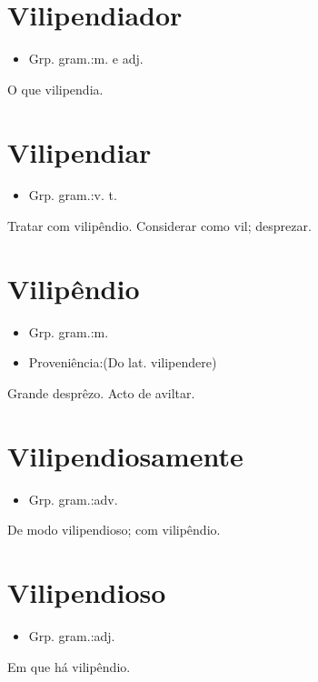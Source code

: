 \documentclass{article}
\begin{document}
\section{Vilipendiador}
\begin{itemize}
\item {Grp. gram.:m.  e  adj.}
\end{itemize}
O que vilipendia.
\section{Vilipendiar}
\begin{itemize}
\item {Grp. gram.:v. t.}
\end{itemize}
Tratar com vilipêndio.
Considerar como vil; desprezar.
\section{Vilipêndio}
\begin{itemize}
\item {Grp. gram.:m.}
\end{itemize}
\begin{itemize}
\item {Proveniência:(Do lat. \textunderscore vilipendere\textunderscore )}
\end{itemize}
Grande desprêzo.
Acto de aviltar.
\section{Vilipendiosamente}
\begin{itemize}
\item {Grp. gram.:adv.}
\end{itemize}
De modo vilipendioso; com vilipêndio.
\section{Vilipendioso}
\begin{itemize}
\item {Grp. gram.:adj.}
\end{itemize}
Em que há vilipêndio.
\end{document}
